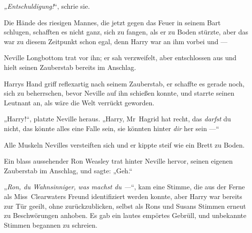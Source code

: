\emph{„Entschuldigung!}“, schrie sie.  

Die Hände des riesigen Mannes, die jetzt gegen das Feuer in seinem Bart schlugen, schafften es nicht ganz, sich zu fangen, als er zu Boden stürzte, aber das war zu diesem Zeitpunkt schon egal, denn Harry war an ihm vorbei und —

Neville Longbottom trat vor ihn; er sah verzweifelt, aber entschlossen aus und hielt seinen Zauberstab bereits im Anschlag.

Harrys Hand griff reflexartig nach seinem Zauberstab, er schaffte es gerade noch, sich zu beherrschen, bevor Neville auf ihn schießen konnte, und starrte seinen Leutnant an, als wäre die Welt verrückt geworden.

„Harry!“, platzte Neville heraus.
„Harry, Mr~Hagrid hat recht, das \emph{darfst} du nicht, das könnte alles eine Falle sein, sie könnten hinter \emph{dir} her sein —“

Alle Muskeln Nevilles versteiften sich und er kippte steif wie ein Brett zu Boden.

Ein blass aussehender Ron Weasley trat hinter Neville hervor, seinen eigenen Zauberstab im Anschlag, und sagte:
„Geh.“

„\emph{Ron, du Wahnsinniger, was machst du —}“, kam eine Stimme, die aus der Ferne als Miss~Clearwaters Freund identifiziert werden konnte, aber Harry war bereits zur Tür geeilt, ohne zurückzublicken, selbst als Rons und Susans Stimmen erneut zu Beschwörungen anhoben. Es gab ein lautes empörtes Gebrüll, und unbekannte Stimmen begannen zu schreien.


